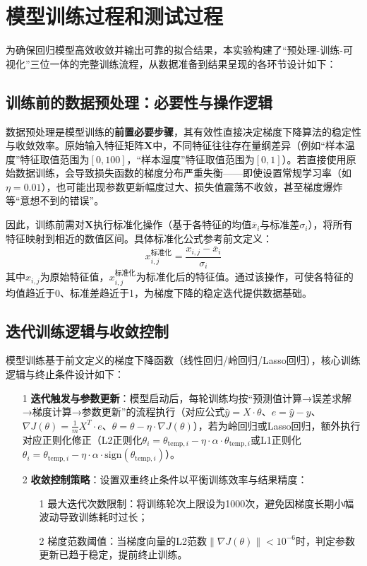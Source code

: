 \section{模型训练过程和测试过程}
为确保回归模型高效收敛并输出可靠的拟合结果，本实验构建了“预处理-训练-可视化”三位一体的完整训练流程，从数据准备到结果呈现的各环节设计如下：

\subsection{训练前的数据预处理：必要性与操作逻辑}
数据预处理是模型训练的\textbf{前置必要步骤}，其有效性直接决定梯度下降算法的稳定性与收敛效率。原始输入特征矩阵$\boldsymbol{X}$中，不同特征往往存在量纲差异（例如“样本温度”特征取值范围为$[0, 100]$，“样本湿度”特征取值范围为$[0, 1]$）。若直接使用原始数据训练，会导致损失函数的梯度分布严重失衡——即使设置常规学习率（如$\eta=0.01$），也可能出现参数更新幅度过大、损失值震荡不收敛，甚至梯度爆炸等“意想不到的错误”。

因此，训练前需对$\boldsymbol{X}$执行标准化操作（基于各特征的均值$\overline{x}_i$与标准差$\sigma_i$），将所有特征映射到相近的数值区间。具体标准化公式参考前文定义：
\[
x_{i,j}^{\text{标准化}} = \frac{x_{i,j} - \overline{x}_i}{\sigma_i}
\]
其中$x_{i,j}$为原始特征值，$x_{i,j}^{\text{标准化}}$为标准化后的特征值。通过该操作，可使各特征的均值趋近于0、标准差趋近于1，为梯度下降的稳定迭代提供数据基础。

\subsection{迭代训练逻辑与收敛控制}
模型训练基于前文定义的梯度下降函数（线性回归/岭回归/Lasso回归），核心训练逻辑与终止条件设计如下：
\begin{itemize}
    \item[1] \textbf{迭代触发与参数更新}：模型启动后，每轮训练均按“预测值计算→误差求解→梯度计算→参数更新”的流程执行（对应公式$\hat{y}=X\cdot\theta$、$e=\hat{y}-y$、$\nabla J(\theta)=\frac{1}{m}X^T\cdot e$、$\theta=\theta-\eta\cdot\nabla J(\theta)$），若为岭回归或Lasso回归，额外执行对应正则化修正（L2正则化$\theta_i=\theta_{\text{temp},i}-\eta\cdot\alpha\cdot\theta_{\text{temp},i}$或L1正则化$\theta_i=\theta_{\text{temp},i}-\eta\cdot\alpha\cdot\text{sign}(\theta_{\text{temp},i})$）。
    \item[2] \textbf{收敛控制策略}：设置双重终止条件以平衡训练效率与结果精度：
    \begin{itemize}
        \item[1] 最大迭代次数限制：将训练轮次上限设为1000次，避免因梯度长期小幅波动导致训练耗时过长；
        \item[2] 梯度范数阈值：当梯度向量的L2范数$\|\nabla J(\theta)\| < 10^{-6}$时，判定参数更新已趋于稳定，提前终止训练。
    \end{itemize}
\end{itemize}

